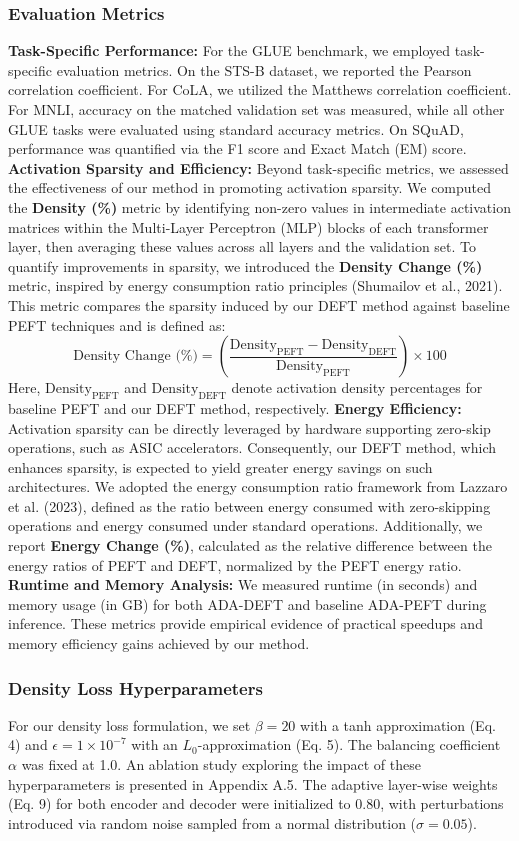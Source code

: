 \documentclass[10pt,twocolumn]{article}
\begin{document}
\subsubsection*{Evaluation Metrics}
\textbf{Task-Specific Performance:} For the GLUE benchmark, we employed task-specific evaluation metrics. On the STS-B dataset, we reported the Pearson correlation coefficient. For CoLA, we utilized the Matthews correlation coefficient. For MNLI, accuracy on the matched validation set was measured, while all other GLUE tasks were evaluated using standard accuracy metrics. On SQuAD, performance was quantified via the F1 score and Exact Match (EM) score. \textbf{Activation Sparsity and Efficiency:} Beyond task-specific metrics, we assessed the effectiveness of our method in promoting activation sparsity. We computed the \textbf{Density (\%)} metric by identifying non-zero values in intermediate activation matrices within the Multi-Layer Perceptron (MLP) blocks of each transformer layer, then averaging these values across all layers and the validation set. To quantify improvements in sparsity, we introduced the \textbf{Density Change (\%)} metric, inspired by energy consumption ratio principles (Shumailov et al., 2021). This metric compares the sparsity induced by our DEFT method against baseline PEFT techniques and is defined as:
\[\text{Density Change (\%)} = \left( \frac{\text{Density}_{\text{PEFT}} - \text{Density}_{\text{DEFT}}}{\text{Density}_{\text{PEFT}}} \right) \times 100\]
Here, \(\text{Density}_{\text{PEFT}}\) and \(\text{Density}_{\text{DEFT}}\) denote activation density percentages for baseline PEFT and our DEFT method, respectively. \textbf{Energy Efficiency:} Activation sparsity can be directly leveraged by hardware supporting zero-skip operations, such as ASIC accelerators. Consequently, our DEFT method, which enhances sparsity, is expected to yield greater energy savings on such architectures. We adopted the energy consumption ratio framework from Lazzaro et al. (2023), defined as the ratio between energy consumed with zero-skipping operations and energy consumed under standard operations. Additionally, we report \textbf{Energy Change (\%)}, calculated as the relative difference between the energy ratios of PEFT and DEFT, normalized by the PEFT energy ratio. \textbf{Runtime and Memory Analysis:} We measured runtime (in seconds) and memory usage (in GB) for both ADA-DEFT and baseline ADA-PEFT during inference. These metrics provide empirical evidence of practical speedups and memory efficiency gains achieved by our method.
\subsubsection*{Density Loss Hyperparameters}
For our density loss formulation, we set \(\beta = 20\) with a tanh approximation (Eq. 4) and \(\epsilon = 1 \times 10^{-7}\) with an \(L_0\)-approximation (Eq. 5). The balancing coefficient \(\alpha\) was fixed at 1.0. An ablation study exploring the impact of these hyperparameters is presented in Appendix A.5. The adaptive layer-wise weights (Eq. 9) for both encoder and decoder were initialized to 0.80, with perturbations introduced via random noise sampled from a normal distribution (\(\sigma = 0.05\)).
\end{document}
